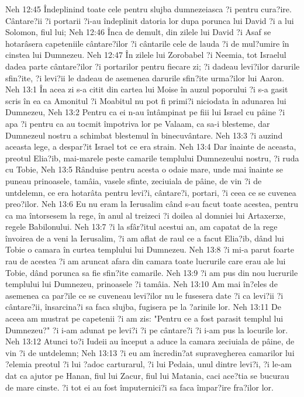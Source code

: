 Neh 12:45  Îndeplinind toate cele pentru slujba dumnezeiasca ?i pentru cura?ire. Cântare?ii ?i portarii ?i-au îndeplinit datoria lor dupa porunca lui David ?i a lui Solomon, fiul lui;
Neh 12:46  Înca de demult, din zilele lui David ?i Asaf se hotarâsera capeteniile cântare?ilor ?i cântarile cele de lauda ?i de mul?umire în cinstea lui Dumnezeu.
Neh 12:47  În zilele lui Zorobabel ?i Neemia, tot Israelul dadea parte cântare?ilor ?i portarilor pentru fiecare zi; ?i dadeau levi?ilor darurile sfin?ite, ?i levi?ii le dadeau de asemenea darurile sfin?ite urma?ilor lui Aaron.
Neh 13:1  În acea zi s-a citit din cartea lui Moise în auzul poporului ?i s-a gasit scris în ea ca Amonitul ?i Moabitul nu pot fi primi?i niciodata în adunarea lui Dumnezeu,
Neh 13:2  Pentru ca ei n-au întâmpinat pe fiii lui Israel cu pâine ?i apa ?i pentru ca au tocmit împotriva lor pe Valaam, ca sa-i blesteme, dar Dumnezeul nostru a schimbat blestemul în binecuvântare.
Neh 13:3  ?i auzind aceasta lege, a despar?it Israel tot ce era strain.
Neh 13:4  Dar înainte de aceasta, preotul Elia?ib, mai-marele peste camarile templului Dumnezeului nostru, ?i ruda cu Tobie,
Neh 13:5  Rânduise pentru acesta o odaie mare, unde mai înainte se puneau prinoasele, tamâia, vasele sfinte, zeciuiala de pâine, de vin ?i de untdelemn, ce era hotarâta pentru levi?i, cântare?i, portari, ?i ceea ce se cuvenea preo?ilor.
Neh 13:6  Eu nu eram la Ierusalim când s-au facut toate acestea, pentru ca ma întorsesem la rege, în anul al treizeci ?i doilea al domniei lui Artaxerxe, regele Babilonului.
Neh 13:7  ?i la sfâr?itul acestui an, am capatat de la rege învoirea de a veni la Ierusalim, ?i am aflat de raul ce a facut Elia?ib, dând lui Tobie o camara în curtea templului lui Dumnezeu.
Neh 13:8  ?i mi-a parut foarte rau de acestea ?i am aruncat afara din camara toate lucrurile care erau ale lui Tobie, dând porunca sa fie sfin?ite camarile.
Neh 13:9  ?i am pus din nou lucrurile templului lui Dumnezeu, prinoasele ?i tamâia.
Neh 13:10  Am mai în?eles de asemenea ca par?ile ce se cuveneau levi?ilor nu le fusesera date ?i ca levi?ii ?i cântare?ii, însarcina?i sa faca slujba, fugisera pe la ?arinile lor.
Neh 13:11  De aceea am mustrat pe capetenii ?i am zis: "Pentru ce a fost parasit templul lui Dumnezeu?" ?i i-am adunat pe levi?i ?i pe cântare?i ?i i-am pus la locurile lor.
Neh 13:12  Atunci to?i Iudeii au început a aduce la camara zeciuiala de pâine, de vin ?i de untdelemn;
Neh 13:13  ?i eu am încredin?at supravegherea camarilor lui ?elemia preotul ?i lui ?adoc carturarul, ?i lui Pedaia, unul dintre levi?i, ?i le-am dat ca ajutor pe Hanan, fiul lui Zacur, fiul lui Matania, caci ace?tia se bucurau de mare cinste. ?i tot ei au fost împuternici?i sa faca împar?ire fra?ilor lor.
